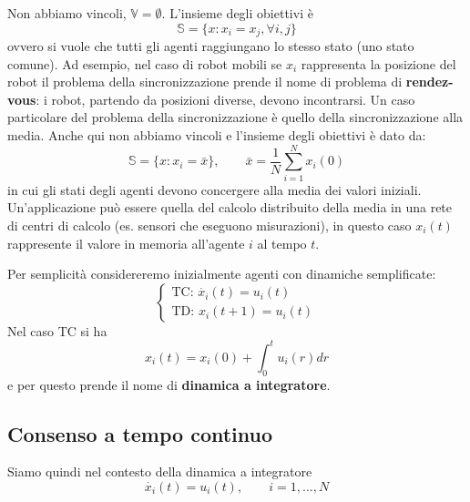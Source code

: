 Non abbiamo vincoli, $\mathbb{V} = \emptyset$. L'insieme degli obiettivi \`e
\begin{equation}
\mathbb{S} = \{x: x_i = x_j, \forall i,j\}
\end{equation}
ovvero si vuole che tutti gli agenti raggiungano lo stesso stato (uno stato comune). Ad esempio, nel caso di robot mobili se $x_i$ rappresenta la posizione del robot il problema della sincronizzazione prende il nome di problema di \textbf{rendez-vous}: i robot, partendo da posizioni diverse, devono incontrarsi.
Un caso particolare del problema della sincronizzazione \`e quello della sincronizzazione alla media.
Anche qui non abbiamo vincoli e l'insieme degli obiettivi \`e dato da:
\begin{equation}
\mathbb{S} = \{x: x_i = \bar{x}\}, \qquad \bar{x} = \frac{1}{N} \sum_{i=1}^N x_i(0)
\end{equation}
in cui gli stati degli agenti devono concergere alla media dei valori iniziali. Un'applicazione pu\`o essere quella del calcolo distribuito della media in una rete di centri di calcolo (es. sensori che eseguono misurazioni), in questo caso $x_i(t)$ rappresente il valore in memoria all'agente $i$ al tempo $t$.


Per semplicit\`a considereremo inizialmente agenti con dinamiche semplificate:
\begin{equation}
\begin{cases}
\text{TC: } \dot{x_i}(t) = u_i(t) \\
\text{TD: } x_i(t+1) = u_i(t)
\end{cases}
\end{equation}
Nel caso TC si ha
\begin{equation}
x_i(t) = x_i(0) + \int_{0}^t u_i(r)dr
\end{equation}
e per questo prende il nome di \textbf{dinamica a integratore}.

\subsection{Consenso a tempo continuo}

Siamo quindi nel contesto della dinamica a integratore
\begin{equation}
\dot{x_i}(t) = u_i(t), \qquad i=1, \dots, N
\end{equation}

